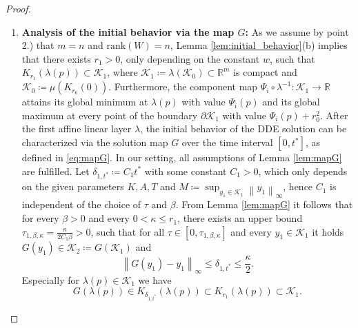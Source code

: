 \documentclass[10pt]{article}
\numberwithin{equation}{section}
\newcommand\norm[1]{\left\lVert#1\right\rVert}
\begin{document}
\begin{proof}
\begin{enumerate}
			\item \textbf{Analysis of the initial behavior via the map $G$: } As we assume by point 2.) that $m = n$ and $\text{rank}(W) = n$, Lemma \ref{lem:initial_behavior}(b) implies that  there exists $r_1 > 0$, only depending on the constant $w$, such that $K_{r_1}(\lambda(p)) \subset \mathcal{K}_1$, where $\mathcal{K}_1\coloneqq \lambda(\mathcal{K}_0)\subset \mathbb{R}^m$ is compact and $\mathcal{K}_0 \coloneqq \mu(K_{r_0}(0))$. Furthermore, the component map $ \Psi_i \circ \lambda^{-1}: \mathcal{K}_1 \rightarrow \mathbb{R}$ attains its global minimum at $\lambda(p)$ with value $\Psi_i(p)$ and its global maximum at every point of the boundary $\partial \mathcal{K}_1$ with value $\Psi_i(p)+r_0^2$. After the first affine linear layer $\lambda$, the initial behavior of the DDE solution can be characterized via the solution map $G$ over the time interval $[0,t^\ast]$, as defined in \eqref{eq:mapG}. In our setting, all assumptions of Lemma \ref{lem:mapG} are fulfilled. Let $\delta_{1,t^\ast}\coloneqq C_1 t^\ast$ with some constant $C_1>0$, which only depends on the given parameters $K, A, T$ and $M \coloneqq \sup_{y_1 \in \mathcal{K}_1} \norm{y_1}_\infty$, hence $C_1$ is independent of the choice of $\tau$ and $\beta$. From Lemma \ref{lem:mapG} it follows that for every $\beta>0$ and every $0<\kappa\leq r_1$, there exists an upper bound $\tau_{1,\beta,\kappa}=\frac{\kappa}{2C_1 \beta}>0$, such that for all $\tau \in [0,\tau_{1,\beta,\kappa}]$ and every $y_1\in \mathcal{K}_1$ it holds $G(y_1)\in\mathcal{K}_2\coloneqq G(\mathcal{K}_1)$ and
			\begin{equation} \label{eq:Glemma}
				\norm{G(y_1)-y_1}_\infty \leq \delta_{1,t^\ast} \leq \frac{\kappa}{2}.
			\end{equation}
			Especially for $\lambda(p)\in \mathcal{K}_1$ we have
			\begin{equation} \label{eq:GlambdaP}
				G(\lambda(p))\in K_{\delta_{1,t^\ast}}(\lambda(p)) \subset K_{r_1}(\lambda(p)) \subset \mathcal{K}_1.
			\end{equation}

\end{enumerate}
\end{proof}
\end{document}

